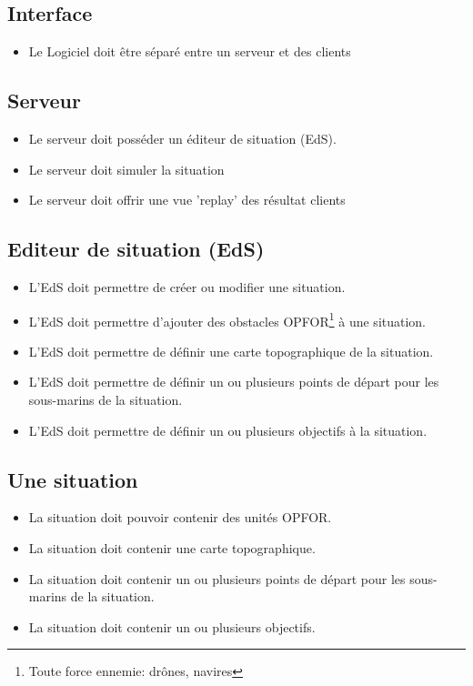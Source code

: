 
\subsection{Interface}
\begin{itemize}
	\item Le Logiciel doit être séparé entre un serveur et des clients
\end{itemize}


\subsection{Serveur}
\begin{itemize}
	\item Le serveur doit posséder un éditeur de situation (EdS).
	\item Le serveur doit simuler la situation
	\item Le serveur doit offrir une vue 'replay' des résultat clients
\end{itemize}



\subsection{Editeur de situation (EdS)}
\begin{itemize}
	\item L'EdS doit permettre de créer ou modifier une situation.
	\item L'EdS doit permettre d'ajouter des obstacles OPFOR\footnote{Toute force ennemie: drônes, navires} à une situation.
	\item L'EdS doit permettre de définir une carte topographique de la situation.
	\item L'EdS doit permettre de définir un ou plusieurs points de départ pour les sous-marins de la situation.
	\item L'EdS doit permettre de définir un ou plusieurs objectifs à la situation.
\end{itemize}

\subsection{Une situation}
\begin{itemize}
	\item La situation doit pouvoir contenir des unités OPFOR.
	\item La situation doit contenir une carte topographique.
	\item La situation doit contenir un ou plusieurs points de départ pour les sous-marins de la situation.
	\item La situation doit contenir un ou plusieurs objectifs.
\end{itemize}


